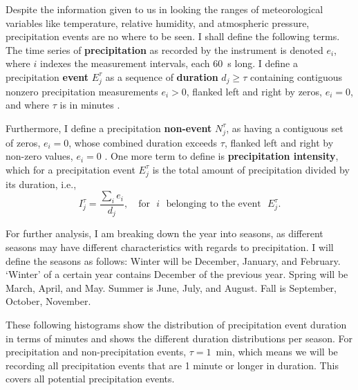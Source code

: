 \documentclass[11pt]{report}
\newcommand{\fracd}[2]{\frac{\displaystyle{#1}}{\displaystyle{#2}}}
\begin{document}
Despite the information given to us in looking the ranges of meteorological
variables like temperature, relative humidity, and atmospheric pressure,
precipitation events are no where to be seen.  I shall define the following
terms. The time series of \textbf{precipitation} as recorded by the
instrument is denoted $e_i$, where $i$ indexes the measurement intervals,
each 60~s long. I define a precipitation \textbf{event} $E_j^\tau $ as a
sequence of \textbf{duration} $d_j\ge \tau$ containing contiguous nonzero
precipitation measurements $e_i>0$, flanked left and right by zeros,
$e_i=0$, and where $\tau$ is in minutes \cite[]{Eagleson}.

Furthermore, I define a precipitation \textbf{non-event} $N_j^\tau$, as
having a contiguous set of zeros, $e_i=0$, whose combined duration exceeds
$\tau$, flanked left and right by non-zero values, $e_i=0$ \cite{Eagleson}.
One more term to define is \textbf{precipitation intensity}, which for a
precipitation event $E_j^\tau$ is the total amount of precipitation divided
by its duration, i.e.,
\begin{equation}
  I_j^\tau = \fracd{\sum_i e_i }{d_j} ,
  \quad
  \mbox{for}\,\,\,\, i\,\,\,\, \mbox{belonging to the event}\,\,\,\, E_j^\tau
  .
\end{equation}

For further analysis, I am breaking down the year into seasons, as different
seasons may have different characteristics with regards to precipitation. I
will define the seasons as follows: Winter will be December, January, and
February. `Winter' of a certain year contains December of the previous
year. Spring will be March, April, and May. Summer is June, July, and
August. Fall is September, October, November.

These following histograms show the distribution of precipitation event
duration in terms of minutes and shows the different duration distributions
per season. For precipitation and non-precipitation events, $\tau = 1$~min,
which means we will be recording all precipitation events that are 1 minute
or longer in duration. This covers all potential precipitation events.
\end{document}
